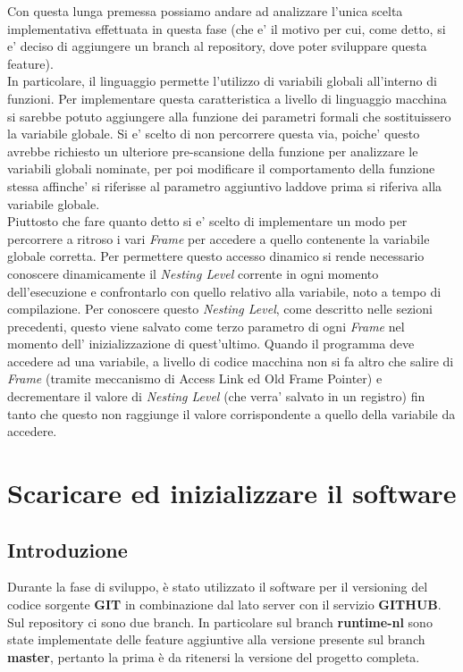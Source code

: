 \documentclass{article}
\begin{document}
Con questa lunga premessa possiamo andare ad analizzare l'unica scelta implementativa effettuata in questa fase (che e' il motivo per cui, come detto, si e' deciso di aggiungere un branch al repository, dove poter sviluppare questa feature).\\
In particolare, il linguaggio permette l'utilizzo di variabili globali all'interno di funzioni. Per implementare questa caratteristica a livello di linguaggio macchina si sarebbe potuto aggiungere alla funzione dei parametri formali che sostituissero la variabile globale. Si e' scelto di non percorrere questa via, poiche' questo avrebbe richiesto un ulteriore pre-scansione della funzione per analizzare le variabili globali nominate, per poi modificare il comportamento della funzione stessa affinche' si riferisse al parametro aggiuntivo laddove prima si riferiva alla variabile globale. \\
Piuttosto che fare quanto detto si e' scelto di implementare un modo per percorrere a ritroso i vari \textit{Frame} per accedere a quello contenente la variabile globale corretta. Per permettere questo accesso dinamico si rende necessario conoscere dinamicamente il \textit{Nesting Level} corrente in ogni momento dell'esecuzione e confrontarlo con  quello relativo alla variabile, noto a tempo di compilazione. Per conoscere questo \textit{Nesting Level}, come descritto nelle sezioni precedenti, questo viene salvato come terzo parametro di ogni \textit{Frame} nel momento dell' inizializzazione di quest'ultimo. Quando il programma deve accedere ad una variabile, a livello di codice macchina non si fa altro che salire di \textit{Frame} (tramite meccanismo di Access Link ed Old Frame Pointer) e decrementare il valore di \textit{Nesting Level} (che verra' salvato in un registro) fin tanto che questo non raggiunge il valore corrispondente a quello della variabile da accedere.

\newpage
\section{Scaricare ed inizializzare il software}

\subsection{Introduzione}

Durante la fase di sviluppo, è stato utilizzato il software per il versioning del codice sorgente \textbf{GIT} in combinazione dal lato server con il servizio \textbf{GITHUB}. Sul repository ci sono due branch. In particolare sul branch \textbf{runtime-nl} sono state implementate delle feature aggiuntive alla versione presente sul branch \textbf{master}, pertanto la prima è da ritenersi la versione del progetto completa.
\end{document}
